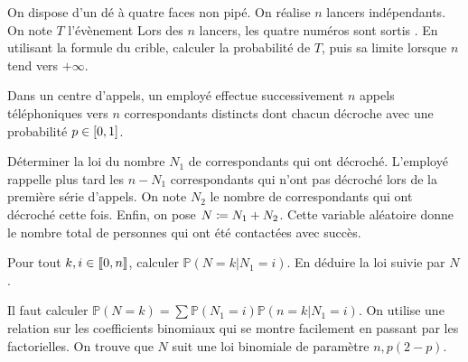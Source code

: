 \documentclass{magnolia}
\begin{document}
On dispose d'un dé à quatre faces non pipé. On réalise $n$ lancers indépendants.
On note $T$ l'évènement  \og Lors des $n$ lancers, les quatre numéros sont sortis \fg.
En utilisant la formule du crible, calculer la probabilité de $T$, puis sa limite lorsque $n$
tend vers $+\infty$.



 Dans un centre d'appels, un employé effectue successivement $n$ appels
  téléphoniques vers $n$ correspondants distincts dont chacun décroche avec une
  probabilité $p\in\left[0,1\right]$.
  \begin{questions}
  \question Déterminer la loi du nombre $N_1$ de correspondants qui ont décroché.
  \question L'employé rappelle plus tard les $n-N_1$ correspondants qui n'ont pas décroché
    lors de la première série d'appels. On note $N_2$ le nombre de correspondants
    qui ont décroché cette fois. Enfin, on pose $N\coloneqq N_1+N_2$. Cette variable aléatoire donne
    le nombre total de personnes qui ont été contactées avec succès.
    \begin{questions}
    \question Pour tout $k,i\in\left\llbracket 0,n\right\rrbracket$, calculer $\mathbb{P}(N=k|N_1=i)$.
    \question En déduire la loi suivie par $N$.
    \end{questions}
  \end{questions}
  \begin{sol}
Il faut calculer $\mathbb{P}(N=k)=\sum \mathbb{P}(N_1=i) \mathbb{P}(n=k|N_1=i)$. On utilise une relation sur
les coefficients binomiaux qui se montre facilement en passant par les factorielles. On trouve que $N$ suit une
loi binomiale de paramètre $n,p(2-p)$.
  \end{sol}



\end{document}
